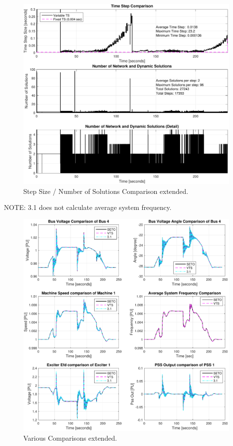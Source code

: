 \begin{figure}[H]
	\centering
	\footnotesize
	\includegraphics[width=\linewidth]{examples/extendedTerm/extended-2}
	\caption{Step Size / Number of Solutions Comparison extended.}
	\label{fig: extended 2}
\end{figure}%




\pagebreak
NOTE: 3.1 does not calculate average system frequency.
\begin{figure}[H]
	\centering
	\footnotesize
	\includegraphics[width=\linewidth]{examples/extendedTerm/extended-3}
	\caption{Various Comparisons extended.}
	\label{fig: extended 3}
\end{figure}%

